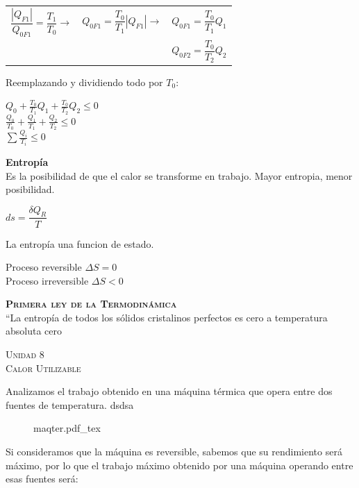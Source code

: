 \documentclass[11pt,a4paper,twocolumn]{article}
\newcommand{\unidad}[2]{\begin{center}
		\fontsize{10}{10}\selectfont\color{gray!50!black}\scshape Unidad #1 \\
		\fontsize{14}{14}\selectfont \scshape #2
\end{center}}
\begin{document}
	\begin{tabular}{r c l} \vspace{.2cm}
	$\dfrac{|Q_{F1}|}{Q_{0F1}}=\dfrac{T_{1}}{T_{0}} \rightarrow$&$Q_{0F1}=\dfrac{T_{0}}{T_{1}} |Q_{F1}|\rightarrow$	&$Q_{0F1}=\dfrac{T_{0}}{T_{1}} Q_{1}$ \\
	& &	$Q_{0F2}=\dfrac{T_{0}}{T_{2}} Q_{2}$\\	
	\end{tabular}
	Reemplazando y dividiendo todo por $T_{0}$:
	\begin{center}
		$Q_{0}+\frac{T_{0}}{T_{1}}Q_{1}+\frac{T_{0}}{T_{2}}Q_{2}\leq0$\\ 
		\vspace{0.2 cm}
		$\frac{Q_{0}}{T_{0}}+\frac{Q_{1}}{T_{1}}+\frac{Q_{2}}{T_{2}}\leq0$\\
		\vspace{0.2 cm}
		$\sum\frac{Q_{i}}{T_{i}}\leq0$\\
	\end{center}

	\textbf{Entropía}\\
	Es la posibilidad de que el calor se transforme en trabajo. Mayor entropia, menor posibilidad.
	\begin{center}
		$ds = \dfrac{\delta Q_{R}}{T}$\\
	\end{center}
    La entropía una funcion de estado.
    
    \begin{center}
    	Proceso reversible $\Delta S = 0$\\
    	Proceso irreversible $\Delta S < 0$\\
    \end{center}
	
	\textbf{\textsc{Primera ley de la Termodinámica}}\\
	``La entropía de todos los sólidos cristalinos perfectos es cero a temperatura absoluta cero
		
		
	\unidad{8}{Calor Utilizable}
	Analizamos el trabajo obtenido en una máquina térmica que opera entre dos fuentes de temperatura.
	dsdsa
		\begin{figure}[ht]
		\centering
		\def\svgwidth{0.2\textwidth}
		{maqter.pdf_tex}
	\end{figure}
	
	Si consideramos que la máquina es reversible, sabemos que su rendimiento será máximo, por lo que el trabajo máximo obtenido por una máquina operando entre esas fuentes será:
	
\end{document}
